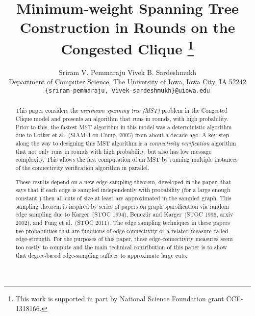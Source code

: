 \documentclass[11pt]{article}
\begin{document}
\title{Minimum-weight Spanning Tree Construction in  Rounds on the Congested Clique
  \thanks{This work is supported in part by National Science Foundation grant CCF-1318166.
  }}
\author{Sriram V. Pemmaraju \hspace{3em} Vivek B. Sardeshmukh\\ \small{Department of Computer Science, The University of Iowa, Iowa City, IA 52242}\\ 
\texttt{\{sriram-pemmaraju, vivek-sardeshmukh\}@uiowa.edu}}
\maketitle
\begin{abstract}
  This paper considers the \textit{minimum spanning tree (MST)} problem in the Congested Clique model and presents an algorithm that runs in  rounds, with high probability. 
  Prior to this, the fastest MST algorithm in this model was a deterministic algorithm due to Lotker et al.~(SIAM J on Comp, 2005) from about a decade ago.
  A key step along the way to designing this MST algorithm is a \textit{connectivity verification} algorithm that not only runs in  rounds with high probability, but also has low message complexity. 
  This allows the fast computation of an MST by running multiple instances of the connectivity verification algorithm in parallel.

  These results depend on a new edge-sampling theorem, developed in the paper, 
  that says that if each edge  is sampled independently with probability  (for a large enough constant ) then
  all cuts of size at least  are approximated in the sampled graph. 
  This sampling theorem is inspired by series of papers on graph sparsification via random edge sampling due to Karger~(STOC 1994),
  Bencz\'{u}r and Karger~(STOC 1996, arxiv 2002), and Fung et al.~(STOC 2011).
  The edge sampling techniques in these papers use probabilities that are functions of edge-connectivity or a related measure called edge-strength.
  For the purposes of this paper, these edge-connectivity measures seem too costly to compute and the main technical contribution of this paper is to
  show that degree-based edge-sampling suffices to approximate large cuts.
\end{abstract}
\end{document}

